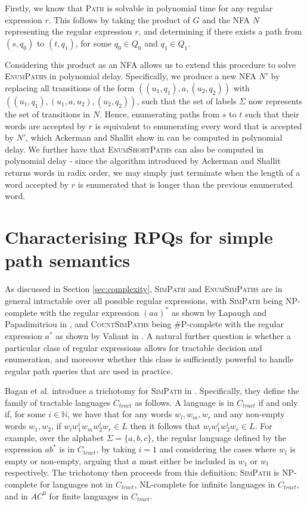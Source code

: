 \documentclass{article}
\begin{document}
Firstly, we know that \textsc{Path} is solvable in polynomial time for any regular expression $r$. This follows by taking the product of $G$ and the NFA $N$ representing the regular expression $r$, and determining if there exists a path from $(s, q_0)$ to $(t, q_1)$, for some $q_0 \in Q_0$ and $q_1 \in Q_1$.

Considering this product as an NFA allows us to extend this procedure to solve \textsc{EnumPaths} in polynomial delay. Specifically, we produce a new NFA $N'$ by replacing all transitions of the form $((u_1, q_1), a, (u_2, q_2))$ with $((u_1, q_1), (u_1, a, u_2), (u_2, q_2))$, such that the set of labels $\Sigma$ now represents the set of transitions in $N$. Hence, enumerating paths from $s$ to $t$ such that their words are accepted by $r$ is equivalent to enumerating every word that is accepted by $N'$, which Ackerman and Shallit show in \cite{ackermanEfficientEnumerationWords2009} can be computed in polynomial delay. We further have that \textsc{EnumShortPaths} can also be computed in polynomial delay - since the algorithm introduced by Ackerman and Shallit returns words in radix order, we may simply just terminate when the length of a word accepted by $r$ is enumerated that is longer than the previous enumerated word.


\section{Characterising RPQs for simple path semantics}
\label{sec:simple_characterisation}

As discussed in Section \ref{sec:complexity}, \textsc{SimPath} and \textsc{EnumSimPaths} are in general intractable over all possible regular expressions, with \textsc{SimPath} being NP-complete with the regular expression $(aa)^*$ as shown by Lapaugh and Papadimitriou in \cite{lapaughEvenpathProblemGraphs1984}, and \textsc{CountSimPaths} being \#P-complete with the regular expression $a^*$ as shown by Valiant in \cite{valiantComplexityComputingPermanent1979}. A natural further question is whether a particular class of regular expressions allows for tractable decision and enumeration, and moreover whether this class is sufficiently powerful to handle regular path queries that are used in practice.

Bagan et al. introduce a trichotomy for \textsc{SimPath} in \cite{baganTrichotomyRegularSimple2020}. Specifically, they define the family of tractable languages $C_{tract}$ as follows. A language is in $C_{tract}$ if and only if, for some $i \in \mathbb{N}$, we have that for any words $w_l, w_m, w_r$ and any non-empty words $w_1, w_2$, if $w_l w_1^i w_m w_2^i w_r \in L$ then it follows that $w_l w_1^i w_2^i w_r \in L$. For example, over the alphabet $\Sigma = \{a, b, c\}$, the regular language defined by the expression $ab^*$ is in $C_{tract}$, by taking $i=1$ and considering the cases where $w_l$ is empty or non-empty, arguing that $a$ must either be included in $w_1$ or $w_l$ respectively. The trichotomy then proceeds from this definition: \textsc{SimPath} is NP-complete for languages not in $C_{tract}$, NL-complete for infinite languages in $C_{tract}$, and in $AC^0$ for finite languages in $C_{tract}$.
\end{document}

